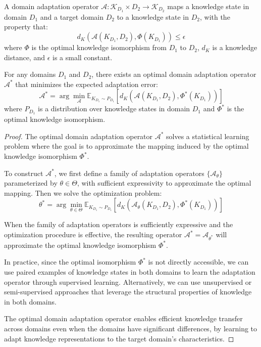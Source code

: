 \begin{definition}
A domain adaptation operator $\mathcal{A}: \mathcal{K}_{D_1} \times D_2 \to \mathcal{K}_{D_2}$ maps a knowledge state in domain $D_1$ and a target domain $D_2$ to a knowledge state in $D_2$, with the property that:
\begin{equation}
d_K(\mathcal{A}(K_{D_1}, D_2), \Phi(K_{D_1})) \leq \epsilon
\end{equation}
where $\Phi$ is the optimal knowledge isomorphism from $D_1$ to $D_2$, $d_K$ is a knowledge distance, and $\epsilon$ is a small constant.
\end{definition}

\begin{theorem}
For any domains $D_1$ and $D_2$, there exists an optimal domain adaptation operator $\mathcal{A}^*$ that minimizes the expected adaptation error:
\begin{equation}
\mathcal{A}^* = \arg\min_{\mathcal{A}} \mathbb{E}_{K_{D_1} \sim P_{D_1}}[d_K(\mathcal{A}(K_{D_1}, D_2), \Phi^*(K_{D_1}))]
\end{equation}
where $P_{D_1}$ is a distribution over knowledge states in domain $D_1$ and $\Phi^*$ is the optimal knowledge isomorphism.
\end{theorem}

\begin{proof}
The optimal domain adaptation operator $\mathcal{A}^*$ solves a statistical learning problem where the goal is to approximate the mapping induced by the optimal knowledge isomorphism $\Phi^*$.

To construct $\mathcal{A}^*$, we first define a family of adaptation operators $\{\mathcal{A}_\theta\}$ parameterized by $\theta \in \Theta$, with sufficient expressivity to approximate the optimal mapping. Then we solve the optimization problem:
\begin{equation}
\theta^* = \arg\min_{\theta \in \Theta} \mathbb{E}_{K_{D_1} \sim P_{D_1}}[d_K(\mathcal{A}_\theta(K_{D_1}, D_2), \Phi^*(K_{D_1}))]
\end{equation}

When the family of adaptation operators is sufficiently expressive and the optimization procedure is effective, the resulting operator $\mathcal{A}^* = \mathcal{A}_{\theta^*}$ will approximate the optimal knowledge isomorphism $\Phi^*$.

In practice, since the optimal isomorphism $\Phi^*$ is not directly accessible, we can use paired examples of knowledge states in both domains to learn the adaptation operator through supervised learning. Alternatively, we can use unsupervised or semi-supervised approaches that leverage the structural properties of knowledge in both domains.

The optimal domain adaptation operator enables efficient knowledge transfer across domains even when the domains have significant differences, by learning to adapt knowledge representations to the target domain's characteristics.
\end{proof}

